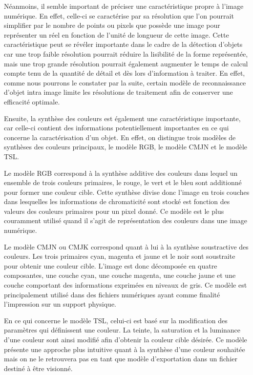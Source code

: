 \documentclass[a4paper,12pt]{article} %
\begin{document}
	Néanmoins, il semble important de préciser une caractéristique propre à l’image numérique. En effet, celle-ci se caractérise par sa résolution que l’on pourrait simplifier par le nombre de points ou pixels que possède une image pour représenter un réel en fonction de l’unité de longueur de cette image. Cette caractéristique peut se révéler importante dans le cadre de la détection d’objets car une trop faible résolution pourrait réduire la lisibilité de la forme représentée, mais une trop grande résolution pourrait également augmenter le temps de calcul compte tenu de la quantité de détail et dès lors d’information à traiter. En effet, comme nous pourrons le constater par la suite, certain modèle de reconnaissance d’objet intra image limite les résolutions de traitement afin de conserver une efficacité optimale. \newline
 \par
    Ensuite, la synthèse des couleurs est également une caractéristique importante, car celle-ci contient des informations potentiellement importantes en ce qui concerne la caractérisation d’un objet. En effet, on distingue trois modèles de synthèses des couleurs principaux, le modèle RGB, le modèle CMJN et le modèle TSL.\newpage
\par
Le modèle RGB correspond à la synthèse additive des couleurs dans lequel un ensemble de trois couleurs primaires, le rouge, le vert et le bleu sont additionné pour former une couleur cible. Cette synthèse divise donc l’image en trois couches dans lesquelles les informations de chromaticité sont stocké est fonction des valeurs des couleurs primaires pour un pixel donné. Ce modèle est le plus couramment utilisé quand il s’agit de représentation des couleurs dans une image numérique.\newline
\par
Le modèle CMJN ou CMJK correspond quant à lui à la synthèse soustractive des couleurs. Les trois primaires cyan, magenta et jaune et le noir sont soustraite pour obtenir une couleur cible. L’image est donc décomposée en quatre composantes, une couche cyan, une couche magenta, une couche jaune et une couche comportant des informations exprimées en niveaux de gris. Ce modèle est principalement utilisé dans des fichiers numériques ayant comme finalité l’impression sur un support physique.\newline
\par
En ce qui concerne le modèle TSL, celui-ci est basé sur la modification des paramètres qui définissent une couleur. La teinte, la saturation et la luminance d’une couleur sont ainsi modifié afin d’obtenir la couleur cible désirée. Ce modèle présente une approche plus intuitive quant à la synthèse d’une couleur souhaitée mais on ne le retrouvera pas en tant que modèle d’exportation dans un fichier destiné à être visionné.\newline
\end{document}
